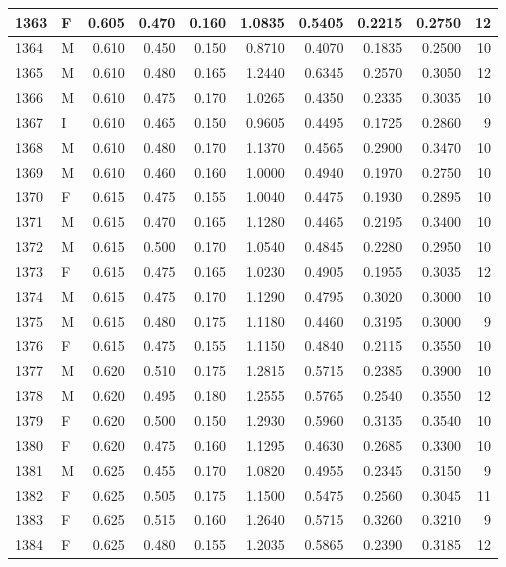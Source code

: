 \documentclass[9pt,twocolumn,twoside,]{pnas-new}
\begin{document}
\begin{tabular}{l|l|r|r|r|r|r|r|r|r}
\hline
1363 & F & 0.605 & 0.470 & 0.160 & 1.0835 & 0.5405 & 0.2215 & 0.2750 & 12\\
\hline
1364 & M & 0.610 & 0.450 & 0.150 & 0.8710 & 0.4070 & 0.1835 & 0.2500 & 10\\
\hline
1365 & M & 0.610 & 0.480 & 0.165 & 1.2440 & 0.6345 & 0.2570 & 0.3050 & 12\\
\hline
1366 & M & 0.610 & 0.475 & 0.170 & 1.0265 & 0.4350 & 0.2335 & 0.3035 & 10\\
\hline
1367 & I & 0.610 & 0.465 & 0.150 & 0.9605 & 0.4495 & 0.1725 & 0.2860 & 9\\
\hline
1368 & M & 0.610 & 0.480 & 0.170 & 1.1370 & 0.4565 & 0.2900 & 0.3470 & 10\\
\hline
1369 & M & 0.610 & 0.460 & 0.160 & 1.0000 & 0.4940 & 0.1970 & 0.2750 & 10\\
\hline
1370 & F & 0.615 & 0.475 & 0.155 & 1.0040 & 0.4475 & 0.1930 & 0.2895 & 10\\
\hline
1371 & M & 0.615 & 0.470 & 0.165 & 1.1280 & 0.4465 & 0.2195 & 0.3400 & 10\\
\hline
1372 & M & 0.615 & 0.500 & 0.170 & 1.0540 & 0.4845 & 0.2280 & 0.2950 & 10\\
\hline
1373 & F & 0.615 & 0.475 & 0.165 & 1.0230 & 0.4905 & 0.1955 & 0.3035 & 12\\
\hline
1374 & M & 0.615 & 0.475 & 0.170 & 1.1290 & 0.4795 & 0.3020 & 0.3000 & 10\\
\hline
1375 & M & 0.615 & 0.480 & 0.175 & 1.1180 & 0.4460 & 0.3195 & 0.3000 & 9\\
\hline
1376 & F & 0.615 & 0.475 & 0.155 & 1.1150 & 0.4840 & 0.2115 & 0.3550 & 10\\
\hline
1377 & M & 0.620 & 0.510 & 0.175 & 1.2815 & 0.5715 & 0.2385 & 0.3900 & 10\\
\hline
1378 & M & 0.620 & 0.495 & 0.180 & 1.2555 & 0.5765 & 0.2540 & 0.3550 & 12\\
\hline
1379 & F & 0.620 & 0.500 & 0.150 & 1.2930 & 0.5960 & 0.3135 & 0.3540 & 10\\
\hline
1380 & F & 0.620 & 0.475 & 0.160 & 1.1295 & 0.4630 & 0.2685 & 0.3300 & 10\\
\hline
1381 & M & 0.625 & 0.455 & 0.170 & 1.0820 & 0.4955 & 0.2345 & 0.3150 & 9\\
\hline
1382 & F & 0.625 & 0.505 & 0.175 & 1.1500 & 0.5475 & 0.2560 & 0.3045 & 11\\
\hline
1383 & F & 0.625 & 0.515 & 0.160 & 1.2640 & 0.5715 & 0.3260 & 0.3210 & 9\\
\hline
1384 & F & 0.625 & 0.480 & 0.155 & 1.2035 & 0.5865 & 0.2390 & 0.3185 & 12\\

\end{tabular}
\end{document}
